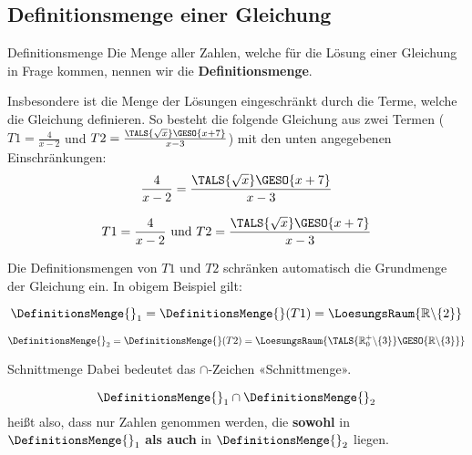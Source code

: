 \newpage

  
\subsection{Definitionsmenge einer
    Gleichung}

\begin{definition}{Definitionsmenge}{}  Die Menge aller Zahlen, welche für die Lösung einer Gleichung in Frage kommen,
  nennen wir die \textbf{Definitionsmenge}.
\end{definition}

  Insbesondere ist die Menge der Lösungen eingeschränkt durch
  die Terme, welche die Gleichung definieren. So besteht die folgende
  Gleichung aus zwei Termen ($T1=\frac{4}{x-2}$ und $T2=\frac{\TALS{\sqrt{x}}\GESO{x+7}}{x-3}$) mit den unten angegebenen
  Einschränkungen:
  $$\frac{4}{x-2}=\frac{\TALS{\sqrt{x}}\GESO{x+7}}{x-3}$$

$$T1=\frac{4}{x-2} \text{ und } T2=\frac{\TALS{\sqrt{x}}\GESO{x+7}}{x-3}$$
  
  Die Definitionsmengen von $T1$ und $T2$ schränken automatisch die
  Grundmenge der Gleichung ein. In obigem Beispiel gilt:
  
  $$\DefinitionsMenge{}_1=\DefinitionsMenge{}(T1)=\LoesungsRaum{\mathbb{R}\backslash\{2\}}$$

  $$\DefinitionsMenge{}_2=\DefinitionsMenge{}(T2)=\LoesungsRaum{\TALS{\mathbb{R}^+_0\backslash\{3\}}\GESO{\mathbb{R}\backslash{}\{3\}}}$$

  

  \begin{bemerkung}{Schnittmenge}{}
    Dabei bedeutet das $\cap$-Zeichen «Schnittmenge».

    $$\DefinitionsMenge{}_1\cap\DefinitionsMenge{}_2$$
    heißt also, dass nur Zahlen genommen werden, die \textbf{sowohl}
    in $\DefinitionsMenge{}_1$ \textbf{als auch} in $\DefinitionsMenge{}_2$ liegen.
    \end{bemerkung}

  \newpage
    
